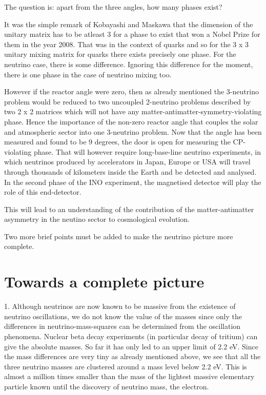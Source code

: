 The question is: apart from the three angles, how many
phases exist? 

It was the simple remark of Kobayashi and Maskawa that 
the dimension of the unitary matrix has to be atleast 3
for a phase to exist that won a Nobel Prize for them in
the year 2008. That was in the context of quarks and so for
the 3 x 3 unitary mixing matrix for quarks there exists
precisely one phase. For the neutrino case, there is some
difference. Ignoring this difference for the moment, there
is one phase in the case of neutrino mixing too.  

However if the reactor angle were zero, then as already 
mentioned the 3-neutrino problem would be reduced to two 
uncoupled 2-neutrino problems described by two 2 x 2 matrices 
which will not have any matter-antimatter-symmetry-violating 
phase. Hence the importance of the non-zero reactor angle that 
couples the solar and atmospheric sector into one 3-neutrino 
problem. Now that the angle has been measured and
found to be 9 degrees, the door is open for measuring 
the CP-violating phase. That will however require long-base-line
neutrino experiments, in which neutrinos produced by accelerators
in Japan, Europe or USA will travel through thousands of kilometers
inside the Earth and be detected and analysed. In the second phase
of the INO experiment, the magnetised detector will play the
role of this end-detector.  

This will lead to an understanding of the contribution of 
the matter-antimatter asymmetry in the neutino sector to
cosmological evolution.

Two more brief points must be added to make the neutrino picture
more complete. 

\section*{Towards a complete picture}

1. Although neutrinos are now known to be massive from the existence of
neutrino oscillations, we do not know the value of the masses since
only the differences in neutrino-mass-squares can be determined from the
oscillation phenomena. Nuclear beta decay experiments (in particular decay
of tritium) can give the absolute masses. So far it has only led to an
upper limit of 2.2 eV. Since the mass differences are very tiny as
already mentioned above, we see that all the three neutrino masses
are clustered around a mass level below 2.2 eV. This is almost a 
million times smaller than the mass of the lightest massive elementary
particle known until the discovery of neutrino mass, the electron.


